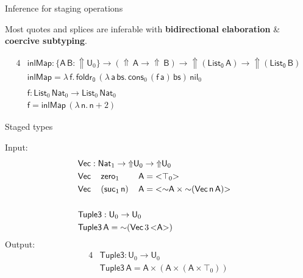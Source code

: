 \documentclass[dvipsnames,aspectratio=169]{beamer}
\newcommand{\msf}[1]{\mathsf{#1}}
\newcommand{\Lift}{{\Uparrow}}
\newcommand{\spl}{{\sim}}
\newcommand{\qut}[1]{{<}#1{>}}
\newcommand{\U}{\msf{U}}
\newcommand{\List}{\msf{List}}
\newcommand{\nil}{\msf{nil}}
\newcommand{\cons}{\msf{cons}}
\newcommand{\Nat}{\msf{Nat}}
\newcommand{\zero}{\msf{zero}}
\newcommand{\suc}{\msf{suc}}
\theoremstyle{remark}
\newcommand{\Vect}{\msf{Vec}}
\newcommand{\msA}{\msf{A}}
\newcommand{\msB}{\msf{B}}
\newcommand{\msbs}{\msf{bs}}
\newcommand{\msff}{\msf{f}}
\newcommand{\msa}{\msf{a}}
\newcommand{\msn}{\msf{n}}
\begin{document}
\begin{frame}{Inference for staging operations}

Most quotes and splices are inferable with \textbf{bidirectional elaboration} \& \textbf{coercive subtyping}.
\pause

\begin{alignat*}{4}
  & \msf{inlMap} : \{\msA\,\msB : \Lift \U_0\} \to (\Lift\,\msA \to \Lift\,\msB) \to \Lift(\msf{List_0}\,\msA) \to \Lift(\msf{List_0}\,\msB) \\
  & \msf{inlMap} = \lambda\,\msff.\,\msf{foldr_0}\,
    (\lambda\,\msa\,\msbs.\,\cons_0\,(\msff\,\msa)\,\msbs)\,
    \nil_0
    \\
  & \\
  & \msf{f} : \List_0\,\Nat_0 \to \List_0\,\Nat_0\\
  & \msf{f} = \msf{inlMap}\,(\lambda\,\msf{n}.\,\msf{n} + 2)
\end{alignat*}



\end{frame}

\begin{frame}{Staged types}

Input:
\begin{alignat*}{4}
  & \rlap{$\Vect : \Nat_1 \to \Lift \U_0 \to \Lift \U_0$}\\
  & \Vect\,&&\zero_1       \,&&\msA = \qut{\top_0}\\
  & \Vect\,&&(\suc_1\,\msn)\,&&\msA = \qut{\spl \msA \times \spl(\Vect\,\msn\,\msA)}\\
  & \\
  & \rlap{$\msf{Tuple3} : \U_0 \to \U_0$} \\
  & \rlap{$\msf{Tuple3}\,\msA = \spl(\Vect\,3\,\qut{\msA})$}
\end{alignat*}
\pause
Output:
\begin{alignat*}{4}
  &\msf{Tuple3} : \U_0 \to \U_0 \\
  &\msf{Tuple3}\,\msA = \msA \times (\msA \times (\msA \times \top_0))
\end{alignat*}

\end{frame}
\end{document}
